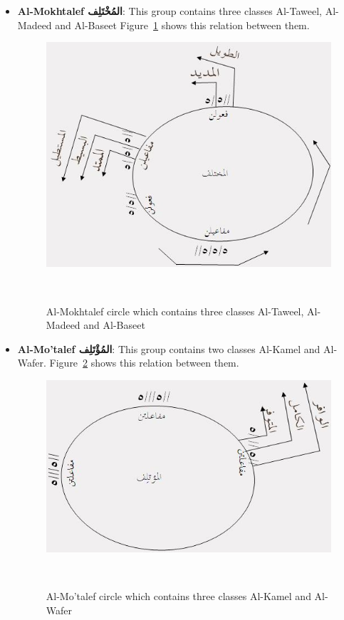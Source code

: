   \begin{itemize}
  \item \textbf{Al-Mokhtalef \textarabic{المُخْتَلِف}}: This group contains three classes Al-Taweel, Al-Madeed and Al-Baseet Figure~\ref{fig:Circle_Mokhtalef} shows this relation between them.

    \begin{figure}[H]
 \includegraphics{./Figures/Ch_2_Background/Al-Mokhtalef.jpg}
 \caption{Al-Mokhtalef circle which contains three classes Al-Taweel, Al-Madeed and Al-Baseet}~\label{fig:Circle_Mokhtalef}
\end{figure}

\item \textbf{Al-Mo'talef \textarabic{المُؤْتَلِف}}: This group contains two classes Al-Kamel and Al-Wafer. Figure~\ref{fig:Circle_Motalef} shows this relation between them.

    \begin{figure}[H]
 \includegraphics{./Figures/Ch_2_Background/Al-Mo'talef.jpg}
 \caption{Al-Mo'talef circle which contains three classes Al-Kamel and Al-Wafer}~\label{fig:Circle_Motalef}
\end{figure}



\end{itemize}

